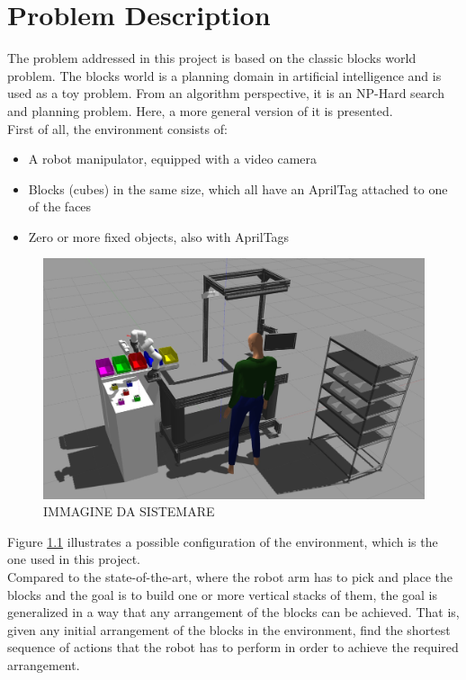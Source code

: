 \chapter{Problem Description} \label{cha:problem_description}

The problem addressed in this project is based on the classic blocks world problem\footnotemark{}. 
The blocks world is a planning domain in artificial intelligence and is used as a toy problem. From an algorithm perspective, it is an NP-Hard search and planning problem.
Here, a more general version of it is presented. \\
First of all, the environment consists of:
\begin{itemize}
	\item A robot manipulator, equipped with a video camera
	\item Blocks (cubes) in the same size, which all have an AprilTag \cite{olson2011tags, wang2016iros} attached to one of the faces
	\item Zero or more fixed objects, also with AprilTags
\end{itemize}

\begin{figure} [h]
\centering
\includegraphics[width=0.9
\textwidth]{figures/Magistrale/env_1_temp}
\caption[Environment Configuration]{ IMMAGINE DA SISTEMARE
\label{fig:env_1}}
\end{figure} 

Figure \ref{fig:env_1} illustrates a possible configuration of the environment, which is the one used in this project. \\
Compared to the state-of-the-art, where the robot arm has to pick and place the blocks and the goal is to build one or more vertical stacks of them, the goal is generalized in a way that any arrangement of the blocks can be achieved. 
That is, given any initial arrangement of the blocks in the environment, find the shortest sequence of actions that the robot has to perform in order to achieve the required arrangement. \\

